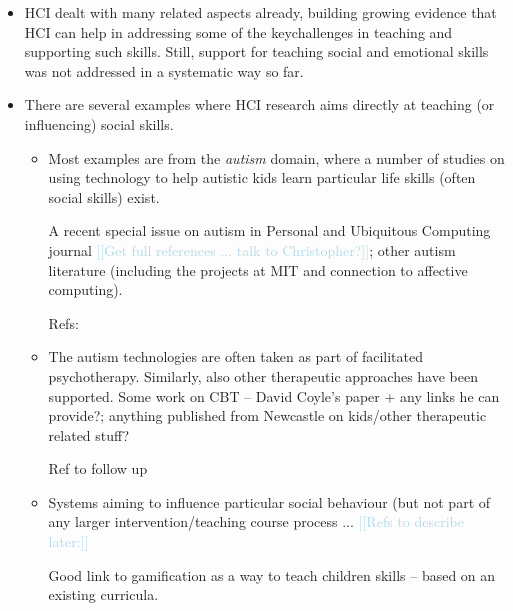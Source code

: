 \documentclass[prodmode,acmtochi]{acmsmall}
\newcommand{\todo}[1]{\textrm{\textrm{\textcolor{LightBlue}{[[#1]]}}}}
\begin{document}
\begin{itemize}
        \item HCI dealt with many related aspects already, building growing evidence that HCI can help in addressing some of the keychallenges in teaching and supporting such skills. Still, support for teaching social and emotional skills was not addressed in a systematic way so far. \bigskip
        
        
        \item There are several examples where HCI research aims directly at teaching (or influencing) social skills. 
        \begin{itemize}

        \item Most examples are from the \emph{autism} domain, where a number of studies on using technology to help autistic kids learn particular life skills (often social skills) exist. 
        
        A recent special issue on autism in Personal and Ubiquitous Computing journal \todo{Get full references ... talk to Christopher?}; other autism literature (including the projects at MIT and connection to affective computing). 

        Refs: \cite{Escobedo2012,Porayska-Pomsta2011,Zarin2011,Tentori2010,Porayska-Pomsta2009,Gotsis2010}

        \item The autism technologies are often taken as part of facilitated psychotherapy. Similarly, also other therapeutic approaches have been supported. Some work on CBT -- David Coyle's paper + any links he can provide?; anything published from Newcastle on kids/other therapeutic related stuff? 
        
        Ref to follow up \cite{DeSa2010,Coyle2007,Coyle2011,Hancock2010,Matthews2011}

        \item Systems aiming to influence particular social behaviour (but not part of any larger intervention/teaching course process ... \todo{Refs to describe later:} \cite{Narumi2009,Piper2006,Balaam2011,Kim2008,McAtamney2006,Schroyen2008,Kim2008a,Toups2007,Kreitmayer2012,Daily2010}

        Good link to gamification as a way to teach children skills \cite{Tan2011} -- based on an existing curricula. 


\end{itemize}
\end{itemize}
\end{document}
